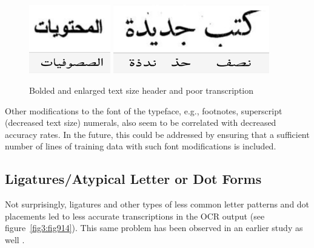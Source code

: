 \begin{figure}[h!tp]
	\centering
	\includegraphics[height=3cm]{images/image5.png}
	\includegraphics[height=3cm]{images/image7.png}
	\caption{Bolded and enlarged text size header and poor transcription}
	\label{fig3:fig7}
\end{figure}

Other modifications to the font of the typeface, e.g., footnotes, superscript
(decreased text size) numerals, also seem to be correlated with decreased
accuracy rates. In the future, this could be addressed by ensuring that a
sufficient number of lines of training data with such font modifications is
included.

\subsection{Ligatures/Atypical Letter or Dot Forms}

Not surprisingly, ligatures and other types of less common letter patterns and
dot placements led to less accurate transcriptions in the OCR output (see
figure~\ref{fig3:fig914}). This same problem has been observed in an earlier study as well \cite{kiessling2017important}.

